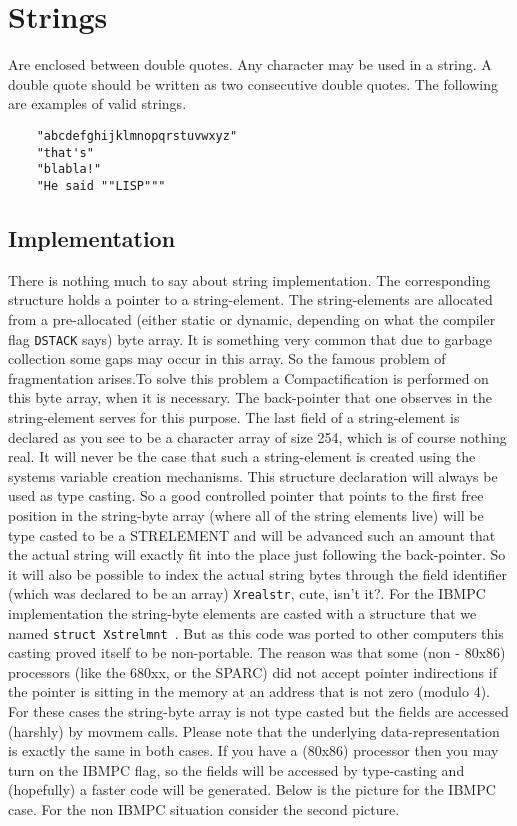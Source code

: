 \section{Strings}
Are enclosed between double quotes. Any character may be used in a  string.
A  double  quote  should  be  written as two consecutive double quotes. The
following are examples of valid strings.
\begin{verbatim}
    "abcdefghijklmnopqrstuvwxyz"
    "that's"
    "blabla!"
    "He said ""LISP"""
\end{verbatim}

\subsection{Implementation}

There is nothing much to say about string implementation. The corresponding
structure  holds  a  pointer  to  a string-element. The string-elements are
allocated from a pre-allocated (either static or dynamic, depending on what
the compiler flag {\tt DSTACK} says)  byte  array.  It  is  something  very
common that due to garbage collection some gaps may occur in this array. So
the  famous  problem  of  fragmentation  arises.To  solve  this  problem  a
Compactification is performed on this byte array, when it is necessary. The
back-pointer that one  observes  in  the  string-element  serves  for  this
purpose.  The last field of a string-element is declared as you see to be a
character array of size 254, which is of course nothing real. It will never
be the case that such a string-element is  created  using  the  \C  systems
variable  creation  mechanisms.  This  structure declaration will always be
used as type casting. So a good controlled pointer that points to the first
free position in the string-byte array (where all of  the  string  elements
live)  will  be type casted to be a STRELEMENT and will be advanced such an
amount that the  actual  string  will  exactly  fit  into  the  place  just
following the back-pointer. So it will also be possible to index the actual
string  bytes  through  the  field  identifier (which was declared to be an
array) {\tt Xrealstr}, cute, isn't it?. For the IBMPC implementation the
string-byte elements are casted with a structure that we named
{\tt struct Xstrelmnt }.  But as this code was ported to other computers
this casting proved itself to be non-portable. The reason was that some
(non - 80x86) processors (like the 680xx, or the SPARC) did not accept
pointer indirections if  the pointer is sitting in the memory at an
address that is not zero (modulo 4). For these cases the string-byte array
is not type casted but the fields are accessed (harshly) by movmem calls.
Please note that the underlying data-representation is exactly the same
in both cases. If you have a (80x86) processor then you may turn on
the IBMPC flag, so the fields will be accessed by type-casting and
(hopefully) a faster code will be generated. Below is the picture for
the IBMPC case. For the non IBMPC situation consider the second picture.

